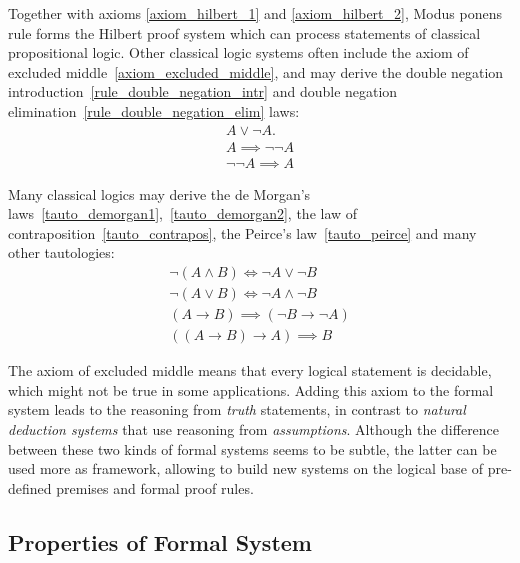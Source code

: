 \documentclass[article]{aaltoseries}
\begin{document}
Together with axioms \eqref{axiom_hilbert_1} and \eqref{axiom_hilbert_2}, Modus ponens rule forms the Hilbert proof system which can process statements of classical propositional logic.
Other classical logic systems often include the axiom of excluded middle~\eqref{axiom_excluded_middle}, and may derive the double negation introduction~\eqref{rule_double_negation_intr} and double negation elimination~\eqref{rule_double_negation_elim} laws:
\begin{gather}
A \lor \neg A.
	\label{axiom_excluded_middle}\tag{EM} \\
%
A \implies \neg \neg A
\label{rule_double_negation_intr}\tag{DNi} \\
%
\neg \neg A \implies A
\label{rule_double_negation_elim}\tag{DNe}
\end{gather}

Many classical logics may derive the de Morgan's laws~\eqref{tauto_demorgan1},~\eqref{tauto_demorgan2}, the law of contraposition~\eqref{tauto_contrapos}, the Peirce's law~\eqref{tauto_peirce} and many other tautologies:
\begin{gather}
\neg (A \land B) \Longleftrightarrow \neg A \lor \neg B 
    \label{tauto_demorgan1}\tag{DM1} \\
\neg (A \lor B) \Longleftrightarrow \neg A \land \neg B 
    \label{tauto_demorgan2}\tag{DM2} \\
(A \rightarrow B) \implies (\neg B \rightarrow \neg A) 
    \label{tauto_contrapos}\tag{CP} \\
((A \rightarrow B) \rightarrow A) \implies B
    \label{tauto_peirce}\tag{PL}
\end{gather}

The axiom of excluded middle means that every logical statement is decidable, which might not be true in some applications. Adding this axiom to the formal system leads to the reasoning from \textit{truth} statements, in contrast to \textit{natural deduction systems} that use reasoning from \textit{assumptions}. Although the difference between these two kinds of formal systems seems to be subtle, the latter can be used more as framework, allowing to build new systems on the logical base of pre-defined premises and formal proof rules. %

\subsection{Properties of Formal System}
\label{sec:properties}
\end{document}
